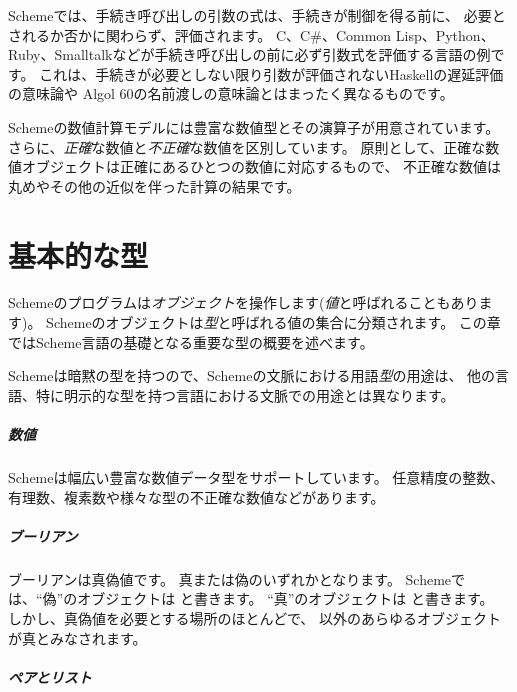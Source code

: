 Schemeでは、手続き呼び出しの引数の式は、手続きが制御を得る前に、
必要とされるか否かに関わらず、評価されます。
C、C\#、Common Lisp、Python、Ruby、Smalltalkなどが手続き呼び出しの前に必ず引数式を評価する言語の例です。
これは、手続きが必要としない限り引数が評価されないHaskellの遅延評価の意味論や
Algol 60の名前渡しの意味論とはまったく異なるものです。

Schemeの数値計算モデルには豊富な数値型とその演算子が用意されています。
さらに、\textit{正確}な数値と\textit{不正確}な数値を区別しています。
原則として、正確な数値オブジェクトは正確にあるひとつの数値に対応するもので、
不正確な数値は丸めやその他の近似を伴った計算の結果です。

\chapter{基本的な型}

Schemeのプログラムは\textit{オブジェクト}を操作します(\textit{値}と呼ばれることもあります)。
Schemeのオブジェクトは\textit{型}と呼ばれる値の集合に分類されます。
この章ではScheme言語の基礎となる重要な型の概要を述べます。

\begin{note}
  Schemeは暗黙の型を持つので、Schemeの文脈における用語\textit{型}の用途は、
  他の言語、特に明示的な型を持つ言語における文脈での用途とは異なります。
\end{note}

\paragraph{数値}

Schemeは幅広い豊富な数値データ型をサポートしています。
任意精度の整数、有理数、複素数や様々な型の不正確な数値などがあります。

\paragraph{ブーリアン}

ブーリアンは真偽値です。
真または偽のいずれかとなります。
Schemeでは、``偽''のオブジェクトは \schfalse{} と書きます。
``真''のオブジェクトは \schtrue{} と書きます。
しかし、真偽値を必要とする場所のほとんどで、
\schfalse{} 以外のあらゆるオブジェクトが真とみなされます。

\paragraph{ペアとリスト}

